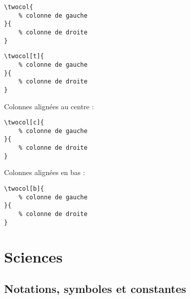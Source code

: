 \documentclass{article}
\begin{document}
\begin{verbatim}
\twocol{
    % colonne de gauche
}{
    % colonne de droite
}
\end{verbatim}

\begin{verbatim}
\twocol[t]{
    % colonne de gauche
}{
    % colonne de droite
}
\end{verbatim}

Colonnes alignées au centre :


\begin{verbatim}
\twocol[c]{
    % colonne de gauche
}{
    % colonne de droite
}
\end{verbatim}

Colonnes alignées en bas :


\begin{verbatim}
\twocol[b]{
    % colonne de gauche
}{
    % colonne de droite
}
\end{verbatim}

\clearpage
\section{Sciences}

\subsection{Notations, symboles et constantes}
\end{document}
